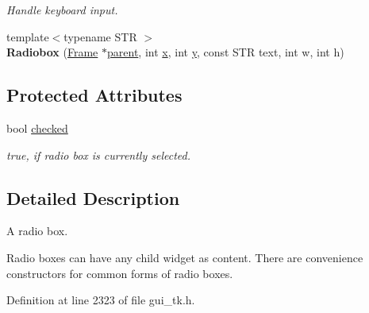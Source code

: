 \begin{DoxyCompactItemize}
\begin{DoxyCompactList}\small\item\em Handle keyboard input. \end{DoxyCompactList}\item 
\hypertarget{classGUI_1_1Radiobox_a1043df1e70f217de9e5e61563f5d8ef1}{{\footnotesize template$<$typename S\-T\-R $>$ }\\{\bfseries Radiobox} (\hyperlink{classGUI_1_1Frame}{Frame} $\ast$\hyperlink{classGUI_1_1Window_a2e593ff65e7702178d82fe9010a0b539}{parent}, int \hyperlink{classGUI_1_1Window_a6ca6a80ca00c9e1d8ceea8d3d99a657d}{x}, int \hyperlink{classGUI_1_1Window_a0ee8e923aff2c3661fc2e17656d37adf}{y}, const S\-T\-R text, int w, int h)}\label{classGUI_1_1Radiobox_a1043df1e70f217de9e5e61563f5d8ef1}

\end{DoxyCompactItemize}
\subsection*{Protected Attributes}
\begin{DoxyCompactItemize}
\item 
\hypertarget{classGUI_1_1Radiobox_ace7ecfe96f9746040c020362d13d7046}{bool \hyperlink{classGUI_1_1Radiobox_ace7ecfe96f9746040c020362d13d7046}{checked}}\label{classGUI_1_1Radiobox_ace7ecfe96f9746040c020362d13d7046}

\begin{DoxyCompactList}\small\item\em {\ttfamily true}, if radio box is currently selected. \end{DoxyCompactList}\end{DoxyCompactItemize}


\subsection{Detailed Description}
A radio box. 

Radio boxes can have any child widget as content. There are convenience constructors for common forms of radio boxes. 

Definition at line 2323 of file gui\-\_\-tk.\-h.



